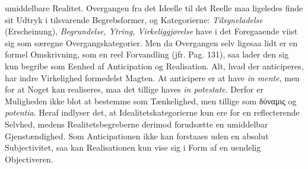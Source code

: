 \documentclass[12pt]{book}
\begin{document}
umiddelbare Realitet. Overgangen fra det Ideelle til det Reelle maa ligeledes finde sit
Udtryk i tilsvarende Begrebsformer, og Kategorierne: \emph{Tilsyneladelse} (Erscheinung),
\emph{Begrundelse, Ytring, Virkeliggjørelse} have i det Foregaaende viist sig som særegne
Overgangskategorier. Men da Overgangen selv ligesaa lidt er en formel Omskrivning, som en
reel Forvandling (jfr. Pag. 131), saa lader den sig kun begribe som Eenhed af Anticipation
og Realisation. Alt, hvad der anticiperes, har indre Virkelighed formedelst Magten. At
anticipere er at have \textit{in mente}, men for at Noget kan realiseres, maa det tillige
haves \textit{in potestate}. Derfor er Muligheden ikke blot at bestemme som Tænkelighed,
men tillige som δύναμις og \textit{potentia}. Heraf indlyser det, at
Idealitetskategorierne kun ere for en reflecterende Selvhed, medens Realitetsbegreberne
derimod forudsætte en umiddelbar Gjenstændighed. Som Anticipationen ikke kan forstaaes
uden en absolut Subjectivitet, saa kan Realisationen kun vise sig i Form af en uendelig
Objectiveren.
\end{document}
